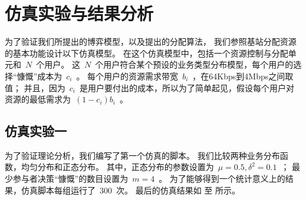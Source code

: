 \section{仿真实验与结果分析}
为了验证我们所提出的博弈模型，以及提出的分配算法，
我们参照基站分配资源的基本功能设计以下仿真模型。
在这个仿真模型中，包括一个资源控制与分配单元和~$N$~个用户。
这~$N$~个用户符合某个预设的业务类型分布模型，每个用户的选择“慷慨”成本为~$c_i$~。
每个用户的资源需求带宽~$b_i$~，在64Kbps到4Mbps之间取值；
并且，因为~$c_i$~是用户要付出的成本，所以为了简单起见，假设每个用户对资源的最低需求为~$(1-c_i)b_i$~。

\subsection{仿真实验一}
为了验证理论分析，我们编写了第一个仿真的脚本。
我们比较两种业务分布函数，均匀分布和正态分布。
其中，正态分布的参数设置为~$\mu = 0.5, \delta^2 = 0.1$~；
最少参与者决策“慷慨”的数目设置为~$m=4$~。
为了能够得到一个统计意义上的结果，仿真脚本每组运行了~$300$~次。
最后的仿真结果如
至
所示。
